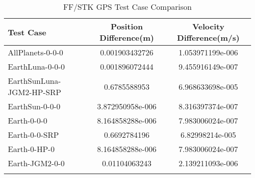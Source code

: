 \begin{table}[htbp!]
\centering
\caption{ FF/STK GPS Test Case Comparison}
      \begin{tabular}{lcc}
      \hline\hline
          Test Case & Position Difference(m) & Velocity Difference(m/s) \\
         \hline
         AllPlanets-0-0-0 & 0.001903432726 & 1.053971199e-006 \\
         EarthLuna-0-0-0 & 0.001896072444 & 9.455916149e-007 \\
         EarthSunLuna-JGM2-HP-SRP & 0.6785588953 & 6.968633698e-005 \\
         EarthSun-0-0-0 & 3.872950958e-006 & 8.316397374e-007 \\
         Earth-0-0-0 & 8.164858288e-006 & 7.983006024e-007 \\
         Earth-0-0-SRP & 0.6692784196 & 6.82998214e-005 \\
         Earth-0-HP-0 & 8.164858288e-006 & 7.983006024e-007 \\
         Earth-JGM2-0-0 & 0.01104063243 & 2.139211093e-006 \\
      \hline\hline
      \label{Table: GPS FF-STK Table} 
\end{tabular}
\end{table}
